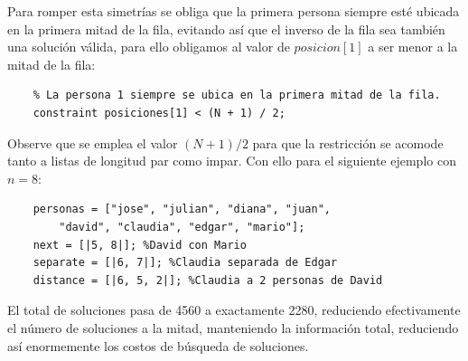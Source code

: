 Para romper esta simetrías se obliga que la primera persona siempre esté ubicada en la primera mitad de la fila, evitando así que el inverso de la fila sea también una solución válida, para ello obligamos al valor de $posicion[1]$ a ser menor a la mitad de la fila:
\begin{verbatim}
    % La persona 1 siempre se ubica en la primera mitad de la fila.
    constraint posiciones[1] < (N + 1) / 2;
\end{verbatim}
Observe que se emplea el valor $(N+1)/2$ para que la restricción se acomode tanto a listas de longitud par como impar. Con ello para el siguiente ejemplo con $n=8$:
\begin{verbatim}
    personas = ["jose", "julian", "diana", "juan",
        "david", "claudia", "edgar", "mario"];
    next = [|5, 8|]; %David con Mario
    separate = [|6, 7|]; %Claudia separada de Edgar
    distance = [|6, 5, 2|]; %Claudia a 2 personas de David
\end{verbatim}
El total de soluciones pasa de 4560 a exactamente 2280, reduciendo efectivamente el número de soluciones a la mitad, manteniendo la información total, reduciendo así enormemente los costos de búsqueda de soluciones.
